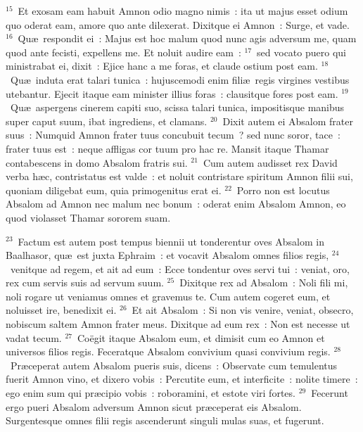${}^{15}$~Et exosam eam habuit Amnon odio magno nimis~: ita ut majus esset odium quo oderat eam, amore quo ante dilexerat. Dixitque ei Amnon~: Surge, et vade.
${}^{16}$~Qu\ae\ respondit ei~: Majus est hoc malum quod nunc agis adversum me, quam quod ante fecisti, expellens me. Et noluit audire eam~:
${}^{17}$~sed vocato puero qui ministrabat ei, dixit~: Ejice hanc a me foras, et claude ostium post eam.
${}^{18}$~Qu\ae\ induta erat talari tunica~: hujuscemodi enim fili\ae\ regis virgines vestibus utebantur. Ejecit itaque eam minister illius foras~: clausitque fores post eam.
${}^{19}$~Qu\ae\ aspergens cinerem capiti suo, scissa talari tunica, impositisque manibus super caput suum, ibat ingrediens, et clamans.
${}^{20}$~Dixit autem ei Absalom frater suus~: Numquid Amnon frater tuus concubuit tecum~? sed nunc soror, tace~: frater tuus est~: neque affligas cor tuum pro hac re. Mansit itaque Thamar contabescens in domo Absalom fratris sui.
${}^{21}$~Cum autem audisset rex David verba h\ae c, contristatus est valde~: et noluit contristare spiritum Amnon filii sui, quoniam diligebat eum, quia primogenitus erat ei.
${}^{22}$~Porro non est locutus Absalom ad Amnon nec malum nec bonum~: oderat enim Absalom Amnon, eo quod violasset Thamar sororem suam.


${}^{23}$~Factum est autem post tempus biennii ut tonderentur oves Absalom in Baalhasor, qu\ae\ est juxta Ephraim~: et vocavit Absalom omnes filios regis,
${}^{24}$~venitque ad regem, et ait ad eum~: Ecce tondentur oves servi tui~: veniat, oro, rex cum servis suis ad servum suum.
${}^{25}$~Dixitque rex ad Absalom~: Noli fili mi, noli rogare ut veniamus omnes et gravemus te. Cum autem cogeret eum, et noluisset ire, benedixit ei.
${}^{26}$~Et ait Absalom~: Si non vis venire, veniat, obsecro, nobiscum saltem Amnon frater meus. Dixitque ad eum rex~: Non est necesse ut vadat tecum.
${}^{27}$~Co\"egit itaque Absalom eum, et dimisit cum eo Amnon et universos filios regis. Feceratque Absalom convivium quasi convivium regis.
${}^{28}$~Pr\ae ceperat autem Absalom pueris suis, dicens~: Observate cum temulentus fuerit Amnon vino, et dixero vobis~: Percutite eum, et interficite~: nolite timere~: ego enim sum qui pr\ae cipio vobis~: roboramini, et estote viri fortes.
${}^{29}$~Fecerunt ergo pueri Absalom adversum Amnon sicut pr\ae ceperat eis Absalom. Surgentesque omnes filii regis ascenderunt singuli mulas suas, et fugerunt.


